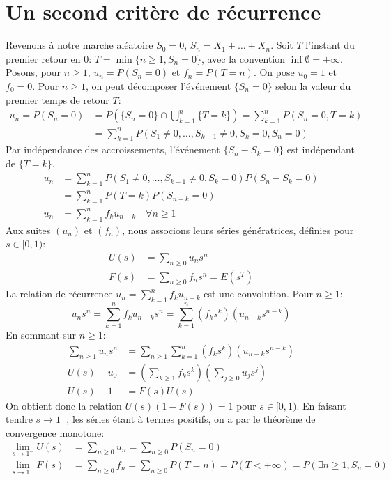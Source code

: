 \section{Un second critère de récurrence}
Revenons à notre marche aléatoire $S_0=0$, $S_n=X_1+\dots+X_n$.
Soit $T$ l'instant du premier retour en 0: $T=\min\{n \ge 1, S_n=0\}$, avec la convention $\inf \emptyset = +\infty$.
Posons, pour $n \ge 1$, $u_n = P(S_n=0)$ et $f_n = P(T=n)$. On pose $u_0=1$ et $f_0=0$.
Pour $n \ge 1$, on peut décomposer l'événement $\{S_n=0\}$ selon la valeur du premier temps de retour $T$:
\begin{align*}
    u_n = P(S_n=0) &= P(\{S_n=0\} \cap \bigcup_{k=1}^n \{T=k\}) = \sum_{k=1}^n P(S_n=0, T=k) \\
    &= \sum_{k=1}^n P(S_1 \neq 0, \dots, S_{k-1} \neq 0, S_k=0, S_n=0)
\end{align*}
Par indépendance des accroissements, l'événement $\{S_n-S_k=0\}$ est indépendant de $\{T=k\}$.
\begin{align*}
    u_n &= \sum_{k=1}^n P(S_1 \neq 0, \dots, S_{k-1} \neq 0, S_k=0) P(S_n-S_k=0) \\
    &= \sum_{k=1}^n P(T=k) P(S_{n-k}=0) \\
    u_n &= \sum_{k=1}^n f_k u_{n-k} \quad \forall n \ge 1
\end{align*}
Aux suites $(u_n)$ et $(f_n)$, nous associons leurs séries génératrices, définies pour $s \in [0,1)$:
\begin{align*}
    U(s) &= \sum_{n \ge 0} u_n s^n \\
    F(s) &= \sum_{n \ge 0} f_n s^n = E(s^T)
\end{align*}
La relation de récurrence $u_n = \sum_{k=1}^n f_k u_{n-k}$ est une convolution. Pour $n \ge 1$:
\begin{equation*}
    u_n s^n = \sum_{k=1}^n f_k u_{n-k} s^n = \sum_{k=1}^n (f_k s^k)(u_{n-k}s^{n-k})
\end{equation*}
En sommant sur $n \ge 1$:
\begin{align*}
    \sum_{n \ge 1} u_n s^n &= \sum_{n \ge 1} \sum_{k=1}^n (f_k s^k)(u_{n-k}s^{n-k}) \\
    U(s) - u_0 &= \left(\sum_{k \ge 1} f_k s^k\right) \left(\sum_{j \ge 0} u_j s^j\right) \\
    U(s) - 1 &= F(s) U(s)
\end{align*}
On obtient donc la relation $U(s)(1 - F(s)) = 1$ pour $s \in [0,1)$.
En faisant tendre $s \to 1^-$, les séries étant à termes positifs, on a par le théorème de convergence monotone:
\begin{align*}
    \lim_{s \to 1^-} U(s) &= \sum_{n \ge 0} u_n = \sum_{n \ge 0} P(S_n=0) \\
    \lim_{s \to 1^-} F(s) &= \sum_{n \ge 0} f_n = \sum_{n \ge 0} P(T=n) = P(T < +\infty) = P(\exists n \ge 1, S_n=0)
\end{align*}
